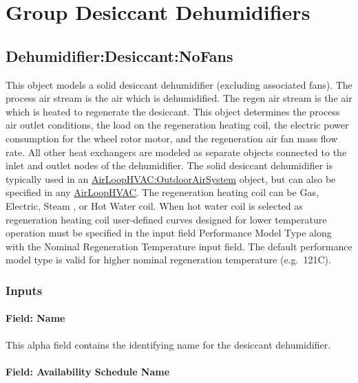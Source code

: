 \section{Group Desiccant Dehumidifiers}\label{group-desiccant-dehumidifiers}

\subsection{Dehumidifier:Desiccant:NoFans}\label{dehumidifierdesiccantnofans}

This object models a solid desiccant dehumidifier (excluding associated fans). The process air stream is the air which is dehumidified. The regen air stream is the air which is heated to regenerate the desiccant. This object determines the process air outlet conditions, the load on the regeneration heating coil, the electric power consumption for the wheel rotor motor, and the regeneration air fan mass flow rate. All other heat exchangers are modeled as separate objects connected to the inlet and outlet nodes of the dehumidifier. The solid desiccant dehumidifier is typically used in an \hyperref[airloophvacoutdoorairsystem]{AirLoopHVAC:OutdoorAirSystem} object, but can also be specified in any \hyperref[airloophvac]{AirLoopHVAC}. The regeneration heating coil can be Gas, Electric, Steam , or Hot Water coil. When hot water coil is selected as regeneration heating coil user-defined curves designed for lower temperature operation must be specified in the input field Performance Model Type along with the Nominal Regeneration Temperature input field. The default performance model type is valid for higher nominal regeneration temperature (e.g.~121C).

\subsubsection{Inputs}\label{inputs-011}

\paragraph{Field: Name}\label{field-name-010}

This alpha field contains the identifying name for the desiccant dehumidifier.

\paragraph{Field: Availability Schedule Name}\label{field-availability-schedule-name-004}

